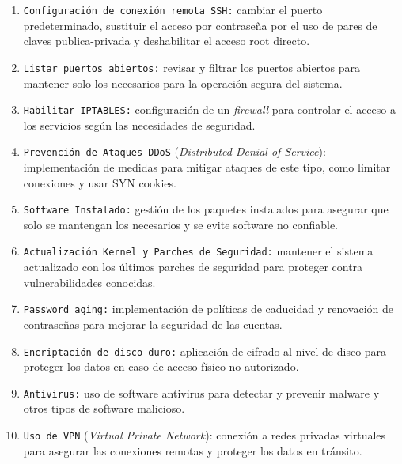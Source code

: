 \begin{enumerate}[label=\Alph*.,itemsep=2pt,parsep=1pt]
    \item \texttt{Configuración de conexión remota SSH:} cambiar el puerto predeterminado, sustituir el acceso por contraseña por el uso de pares de claves publica-privada y deshabilitar el acceso root directo.
    \vspace{1mm}
    \item \texttt{Listar puertos abiertos:} revisar y filtrar los puertos abiertos para mantener solo los necesarios para la operación segura del sistema. \\
    \item \texttt{Habilitar IPTABLES:} configuración de un \textit{firewall} para controlar el acceso a los servicios según las necesidades de seguridad. \\
    \item \texttt{Prevención de Ataques \gls{DDoS}} (\textit{Distributed Denial-of-Service}): implementación de medidas para mitigar ataques de este tipo, como limitar conexiones y usar SYN cookies. \\
    \item \texttt{Software Instalado:} gestión de los paquetes instalados para asegurar que solo se mantengan los necesarios y se evite software no confiable. \\
    \item \texttt{Actualización Kernel y Parches de Seguridad:} mantener el sistema actualizado con los últimos parches de seguridad para proteger contra vulnerabilidades conocidas. \\
    \item \texttt{Password aging:} implementación de políticas de caducidad y renovación de contraseñas para mejorar la seguridad de las cuentas. \\
    \item \texttt{Encriptación de disco duro:} aplicación de cifrado al nivel de disco para proteger los datos en caso de acceso físico no autorizado. \\
    \item \texttt{Antivirus:} uso de software antivirus para detectar y prevenir malware y otros tipos de software malicioso. \\
    \item \texttt{Uso de \gls{VPN}} (\textit{Virtual Private Network}): conexión a redes privadas virtuales para asegurar las conexiones remotas y proteger los datos en tránsito. \\

\end{enumerate}
